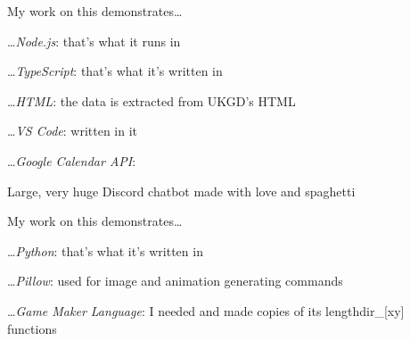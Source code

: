 \documentclass[10mm,letterpaper,notitlepage]{article}
\begin{document}
					My work on this demonstrates\ldots
						\setlength{\parindent}{\parindent+4mm}
						
						
								\fontsize{2.6999999999999997mm}{3.5999999999999996mm}\selectfont
								\color[RGB]{0, 0, 0}
							\ldots\textit{Node.js}: that's what it runs in
							
							\ldots\textit{TypeScript}: that's what it's written in
							
							\ldots\textit{HTML}: the data is extracted from UKGD's HTML
							
							\ldots\textit{VS Code}: written in it
							
							\ldots\textit{Google Calendar API}: 
							
						\setlength{\parindent}{\parindent-4mm}
							\fontsize{4.5mm}{6.0mm}\selectfont
							\color[RGB]{153, 141, 163}
						\color[RGB]{153, 141, 163}{R}\color[RGB]{153, 141, 163}{S}\color[RGB]{153, 141, 163}{R}\color[RGB]{153, 141, 163}{B}\color[RGB]{153, 141, 163}{ }\color[RGB]{153, 141, 163}{C}\color[RGB]{153, 141, 163}{l}\color[RGB]{153, 141, 163}{a}\color[RGB]{153, 141, 163}{s}\color[RGB]{153, 141, 163}{s}\color[RGB]{153, 141, 163}{i}\color[RGB]{153, 141, 163}{c}
						\fontsize{2.6999999999999997mm}{3.5999999999999996mm}\selectfont
						\color[RGB]{0, 0, 0}
					Large, very huge Discord chatbot made with love and spaghetti
					
					My work on this demonstrates\ldots
						\setlength{\parindent}{\parindent+4mm}
						
						
								\fontsize{2.6999999999999997mm}{3.5999999999999996mm}\selectfont
								\color[RGB]{0, 0, 0}
							\ldots\textit{Python}: that's what it's written in
							
							\ldots\textit{Pillow}: used for image and animation generating commands
							
							\ldots\textit{Game Maker Language}: I needed and made copies of its lengthdir\_[xy] functions
							
\end{document}
